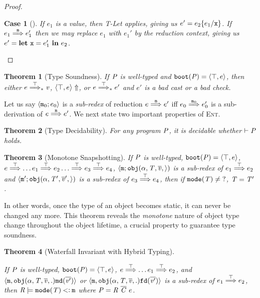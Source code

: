 \documentclass[onecolumn,nocopyrightspace]{sigplanconf}
\newtheorem{theorem}{Theorem} %
\theoremstyle{lessintrusive}
\theoremstyle{plain}
\theoremstyle{custom}
\newtheorem*{case}{Case}
\newcommand{\ourlang}{\textsc{Ent}}
\begin{document}
\begin{proof}
\begin{case}[]
If $e_1$ is a value, then T-Let applies, giving us $e' = e_2\{e_1/\mathtt{x}\}$. If $e_1\stackrel{\mathtt{m}}{\Longrightarrow}e_1'$ then we may replace $e_1$ with $e_1'$ by the reduction context, giving us $e' = \texttt{\bf let}\ \mathtt{x} = e_1'\ \texttt{\bf in}\ e_2$.

\end{case}


\end{proof}



\begin{theorem}[Type Soundness]
\label{pf:staticsoundness}
If $ \mathit{P}$ is well-typed and $\mathtt{boot}(\mathit{P}) = \langle\top,e\rangle$, then either $e \stackrel{\top}{\Longrightarrow}_{*} \mathit{v}$, $\langle\top,e\rangle \Uparrow$, or $e \stackrel{\top}{\Longrightarrow}_{*} e'$ and $e'$ is a bad cast or a bad check.
\end{theorem}

Let us say $\langle\mathtt{m}_0;e_0\rangle$ is a \emph{sub-redex} of reduction $e \stackrel{\mathtt{m}}{\Longrightarrow} e'$ iff $e_0 \stackrel{\mathtt{m}_0}{\Longrightarrow} e'_0$ is a sub-derivation of $e \stackrel{\mathtt{m}}{\Longrightarrow} e'$. We next state two important properties of \ourlang{}. 

\begin{theorem}[Type Decidability]
\label{pf:typedecidability}
For any program $\mathit{P}$, it is decidable whether $\vdash \mathit{P}$ holds.
\end{theorem} 

\begin{theorem}[Monotone Snapshotting]

If $ \mathit{P}$ is well-typed, $\mathtt{boot}(\mathit{P}) = \langle\top,e\rangle$, $e \stackrel{\top}{\Longrightarrow} \dots e_1 \stackrel{\top}{\Longrightarrow} e_2 \dots\stackrel{\top}{\Longrightarrow} e_3 \stackrel{\top}{\Longrightarrow} e_4$,  $\langle\mathtt{m}; \mathtt{obj}( \alpha, \mathit{T},\overline{\mathit{v}},\rangle)$ is a sub-redex of $e_1 \stackrel{\top}{\Longrightarrow} e_2$ and $\langle\mathtt{m}'; \mathtt{obj}( \alpha, \mathit{T}',\overline{\mathit{v}}',\rangle)$ is a sub-redex of $e_3 \stackrel{\top}{\Longrightarrow} e_4$, then if $\mathtt{mode}(\mathit{T}) \neq \mathtt{?}$, $\mathit{T} = \mathit{T}'$. 
\end{theorem}

In other words, once the type of an object becomes static, it can never be changed any more. This theorem reveals the \emph{monotone} nature of object type change throughout the object lifetime, a crucial property to guarantee type soundness. 

\begin{theorem}[Waterfall Invariant with Hybrid Typing]
\label{pf:waterfallinvariant}

If $ \mathit{P}$ is well-typed, $\mathtt{boot}(\mathit{P}) = \langle\top,e\rangle$, $e \stackrel{\top}{\Longrightarrow} \dots e_1 \stackrel{\top}{\Longrightarrow} e_2$, and $\langle\mathtt{m},\mathtt{obj}(\alpha, \mathit{T},\overline{\mathit{v}},.)\mathtt{md}(\overline{\mathit{v}'})\rangle$ or $\langle\mathtt{m},\mathtt{obj}(\alpha, \mathit{T},\overline{\mathit{v}},.)\mathtt{fd}(\overline{\mathit{v}'})\rangle$ is a sub-redex of $e_1 \stackrel{\top}{\Longrightarrow} e_2$, then $\mathit{R} \models \mathtt{mode}(\mathit{T}) \mathbin{<\vcentcolon} \mathtt{m}$ where $\programcode = \rodef \ \overline{\classes} \ e$.
\end{theorem} 
\end{document}
